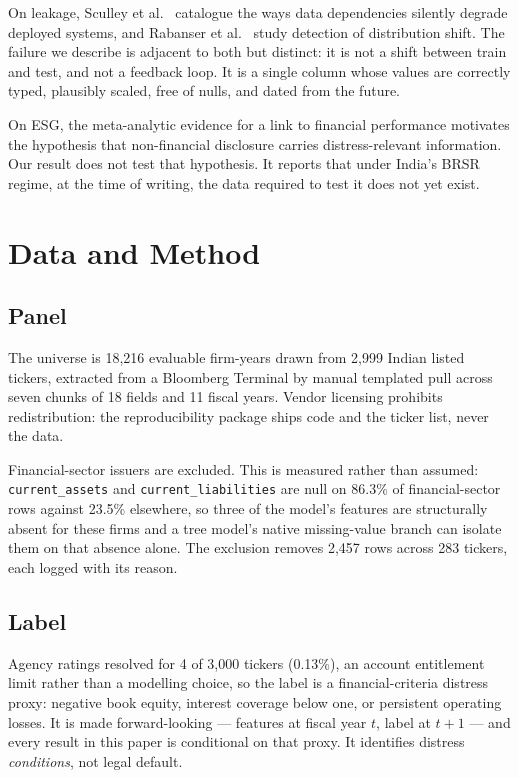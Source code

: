 \documentclass[conference]{IEEEtran}
\begin{document}
On leakage, Sculley et al.\ \cite{sculley2015} catalogue the ways data
dependencies silently degrade deployed systems, and Rabanser et al.\
\cite{rabanser2019} study detection of distribution shift. The failure we
describe is adjacent to both but distinct: it is not a shift between train and
test, and not a feedback loop. It is a single column whose values are
correctly typed, plausibly scaled, free of nulls, and dated from the future.

On ESG, the meta-analytic evidence for a link to financial performance
\cite{friede2015,bassen2006} motivates the hypothesis that non-financial
disclosure carries distress-relevant information. Our result does not test that
hypothesis. It reports that under India's BRSR regime, at the time of writing,
the data required to test it does not yet exist.

\section{Data and Method}

\subsection{Panel}
The universe is 18,216 evaluable firm-years drawn from 2,999 Indian
listed tickers, extracted from a Bloomberg Terminal by manual templated pull
across seven chunks of 18 fields and 11 fiscal years. Vendor licensing
prohibits redistribution: the reproducibility package ships code and the ticker
list, never the data.

Financial-sector issuers are excluded. This is measured rather than assumed:
\texttt{current\_assets} and \texttt{current\_liabilities} are null on 86.3\%
of financial-sector rows against 23.5\% elsewhere, so three of the model's
features are structurally absent for these firms and a tree model's native
missing-value branch can isolate them on that absence alone. The exclusion
removes 2,457 rows across 283 tickers, each logged with its reason.

\subsection{Label}
Agency ratings resolved for 4 of 3,000 tickers (0.13\%), an account entitlement
limit rather than a modelling choice, so the label is a financial-criteria
distress proxy: negative book equity, interest coverage below one, or
persistent operating losses. It is made forward-looking --- features at fiscal
year $t$, label at $t+1$ --- and every result in this paper is conditional on
that proxy. It identifies distress \emph{conditions}, not legal default.
\end{document}
